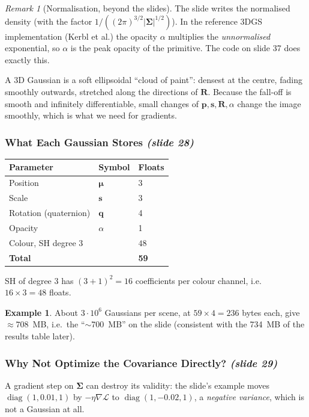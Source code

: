 \documentclass[11pt,a4paper]{article}
\newcommand{\Lc}{\mathcal{L}}
\DeclareMathOperator{\diag}{diag}
\newcommand{\sr}[1]{\texorpdfstring{\emph{(#1)}}{(#1)}}
\theoremstyle{definition}
\newtheorem{example}[definition]{Example}
\theoremstyle{algstyle}
\theoremstyle{plain}
\theoremstyle{remark}
\newtheorem{remark}[definition]{Remark}
\begin{document}
\begin{remark}[Normalisation, beyond the slides]
The slide writes the normalised density (with the factor $1/((2\pi)^{3/2}|\bm\Sigma|^{1/2})$). In the reference 3DGS implementation (Kerbl et al.) the opacity $\alpha$ multiplies the \emph{unnormalised} exponential, so $\alpha$ is the peak opacity of the primitive. The code on slide 37 does exactly this.
\end{remark}

\begin{intuition}
A 3D Gaussian is a soft ellipsoidal ``cloud of paint'': densest at the centre, fading smoothly outwards, stretched along the directions of $\bm R$. Because the fall-off is smooth and infinitely differentiable, small changes of $\bm p,\bm s,\bm R,\alpha$ change the image smoothly, which is what we need for gradients.
\end{intuition}

\subsubsection{What Each Gaussian Stores \sr{slide 28}}
\begin{center}
\begin{tabular}{@{}lll@{}}
\toprule
Parameter & Symbol & Floats \\ \midrule
Position & $\bm\mu$ & 3 \\
Scale & $\bm s$ & 3 \\
Rotation (quaternion) & $\bm q$ & 4 \\
Opacity & $\alpha$ & 1 \\
Colour, SH degree 3 & & $48$ \\ \midrule
\textbf{Total} & & \textbf{59} \\ \bottomrule
\end{tabular}
\end{center}
SH of degree 3 has $(3+1)^2=16$ coefficients per colour channel, i.e.\ $16\times3=48$ floats.

\begin{example}
About $3\cdot10^{6}$ Gaussians per scene, at $59\times4=236$ bytes each, give $\approx708$~MB, i.e.\ the ``$\sim$700~MB'' on the slide (consistent with the 734~MB of the results table later).
\end{example}

\subsubsection{Why Not Optimize the Covariance Directly? \sr{slide 29}}
A gradient step on $\bm\Sigma$ can destroy its validity: the slide's example moves $\diag(1,0.01,1)$ by $-\eta\nabla\Lc$ to $\diag(1,-0.02,1)$, a \emph{negative variance}, which is not a Gaussian at all.
\end{document}
